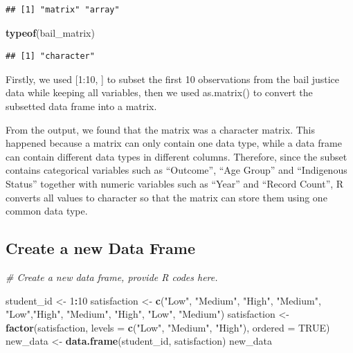 \documentclass[
]{article}
\newenvironment{Shaded}{\begin{snugshade}}{\end{snugshade}}
\newcommand{\AttributeTok}[1]{\textcolor[rgb]{0.13,0.29,0.53}{#1}}
\newcommand{\CommentTok}[1]{\textcolor[rgb]{0.56,0.35,0.01}{\textit{#1}}}
\newcommand{\ConstantTok}[1]{\textcolor[rgb]{0.56,0.35,0.01}{#1}}
\newcommand{\DecValTok}[1]{\textcolor[rgb]{0.00,0.00,0.81}{#1}}
\newcommand{\FunctionTok}[1]{\textcolor[rgb]{0.13,0.29,0.53}{\textbf{#1}}}
\newcommand{\NormalTok}[1]{#1}
\newcommand{\OtherTok}[1]{\textcolor[rgb]{0.56,0.35,0.01}{#1}}
\newcommand{\SpecialCharTok}[1]{\textcolor[rgb]{0.81,0.36,0.00}{\textbf{#1}}}
\newcommand{\StringTok}[1]{\textcolor[rgb]{0.31,0.60,0.02}{#1}}
\begin{document}
\begin{verbatim}
## [1] "matrix" "array"
\end{verbatim}

\begin{Shaded}
\begin{Highlighting}[]
\FunctionTok{typeof}\NormalTok{(bail\_matrix)}
\end{Highlighting}
\end{Shaded}

\begin{verbatim}
## [1] "character"
\end{verbatim}

Firstly, we used {[}1:10, {]} to subset the first 10 observations from
the bail justice data while keeping all variables, then we used
as.matrix() to convert the subsetted data frame into a matrix.

From the output, we found that the matrix was a character matrix. This
happened because a matrix can only contain one data type, while a data
frame can contain different data types in different columns. Therefore,
since the subset contains categorical variables such as ``Outcome'',
``Age Group'' and ``Indigenous Status'' together with numeric variables
such as ``Year'' and ``Record Count'', R converts all values to
character so that the matrix can store them using one common data type.

\subsection{\texorpdfstring{\textbf{Create a new Data
Frame}}{Create a new Data Frame}}\label{create-a-new-data-frame}

\begin{Shaded}
\begin{Highlighting}[]
\CommentTok{\# Create a new data frame, provide R codes here.}

\NormalTok{student\_id }\OtherTok{\textless{}{-}} \DecValTok{1}\SpecialCharTok{:}\DecValTok{10}
\NormalTok{satisfaction }\OtherTok{\textless{}{-}} \FunctionTok{c}\NormalTok{(}\StringTok{"Low"}\NormalTok{, }\StringTok{"Medium"}\NormalTok{, }\StringTok{"High"}\NormalTok{, }\StringTok{"Medium"}\NormalTok{, }\StringTok{"Low"}\NormalTok{,}\StringTok{"High"}\NormalTok{, }\StringTok{"Medium"}\NormalTok{, }\StringTok{"High"}\NormalTok{, }\StringTok{"Low"}\NormalTok{, }\StringTok{"Medium"}\NormalTok{)}
\NormalTok{satisfaction }\OtherTok{\textless{}{-}} \FunctionTok{factor}\NormalTok{(satisfaction,}
                       \AttributeTok{levels =} \FunctionTok{c}\NormalTok{(}\StringTok{"Low"}\NormalTok{, }\StringTok{"Medium"}\NormalTok{, }\StringTok{"High"}\NormalTok{),}
                       \AttributeTok{ordered =} \ConstantTok{TRUE}\NormalTok{)}
\NormalTok{new\_data }\OtherTok{\textless{}{-}} \FunctionTok{data.frame}\NormalTok{(student\_id, satisfaction)}
\NormalTok{new\_data}
\end{Highlighting}
\end{Shaded}
\end{document}
